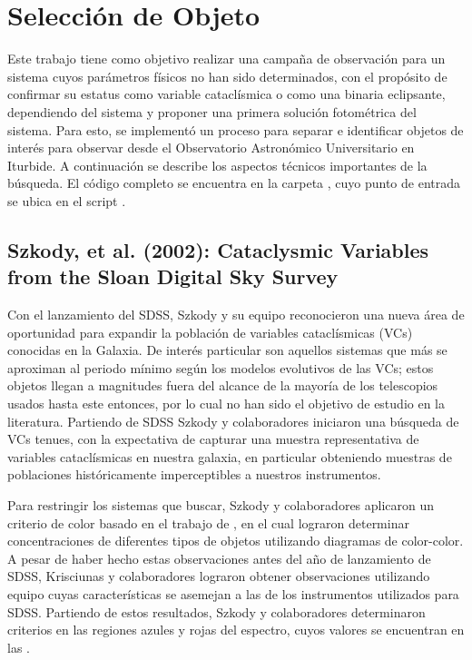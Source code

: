 \chapter{Selección de Objeto}

Este trabajo tiene como objetivo realizar una campaña de observación para un
sistema cuyos parámetros físicos no han sido determinados, con el propósito de
confirmar su estatus como variable cataclísmica o como una binaria eclipsante,
dependiendo del sistema y proponer una primera solución fotométrica del sistema.
Para esto, se implementó un proceso para separar e identificar objetos de
interés para observar desde el Observatorio Astronómico Universitario en
Iturbide. A continuación se describe los aspectos técnicos importantes de la
búsqueda. El código completo se encuentra en la carpeta
\href{https://github.com/KnightIV/UANL_MAPTA_Observaciones/tree/main/obsrv_plan}{},
cuyo punto de entrada se ubica en el script
\href{URLhttps://github.com/KnightIV/UANL_MAPTA_Observaciones/blob/main/obsrv_plan/main.py}{}.

\section{Szkody, et al. (2002): Cataclysmic Variables from the Sloan Digital Sky Survey} \label{muestra:szkody2002}

Con el lanzamiento del SDSS, Szkody y su equipo reconocieron una nueva área de
oportunidad para expandir la población de variables cataclísmicas (VCs)
conocidas en la Galaxia. De interés particular son aquellos sistemas que más se
aproximan al periodo mínimo según los modelos evolutivos de las VCs; estos
objetos llegan a magnitudes fuera del alcance de la mayoría de los telescopios
usados hasta este entonces, por lo cual no han sido el objetivo de estudio en la
literatura. Partiendo de SDSS Szkody y colaboradores iniciaron una búsqueda de
VCs tenues, con la expectativa de capturar una muestra representativa de
variables cataclísmicas en nuestra galaxia, en particular obteniendo muestras de
poblaciones históricamente imperceptibles a nuestros instrumentos.

Para restringir los sistemas que buscar, Szkody y colaboradores aplicaron un
criterio de color basado en el trabajo de , en
el cual lograron determinar concentraciones de diferentes tipos de objetos
utilizando diagramas de color-color. A pesar de haber hecho estas observaciones
antes del año de lanzamiento de SDSS, Krisciunas y colaboradores lograron
obtener observaciones utilizando equipo cuyas características se asemejan a las
de los instrumentos utilizados para SDSS. Partiendo de estos resultados, Szkody
y colaboradores determinaron criterios en las regiones azules y rojas del
espectro, cuyos valores se encuentran en las  
.

